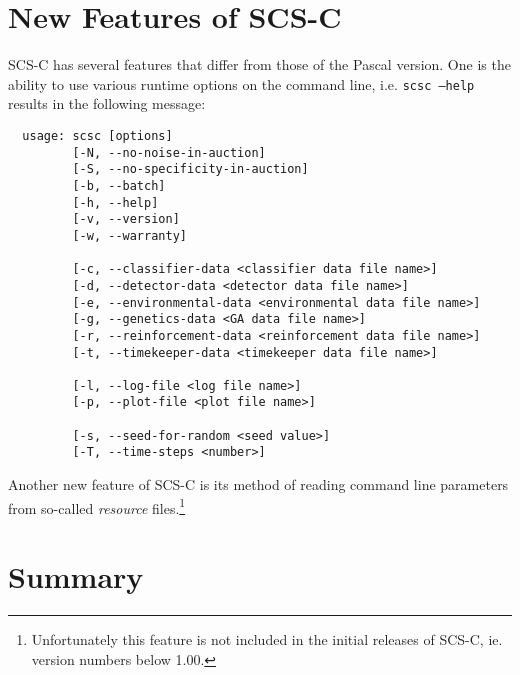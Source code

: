 \section{New Features of SCS-C}
\label{features}

SCS-C has several features that differ from those of the Pascal version.
One is the ability to use various runtime options on the command line, i.e.
{\tt scsc --help} results in the following message:
{\small
\begin{verbatim}
  usage: scsc [options]
         [-N, --no-noise-in-auction]
         [-S, --no-specificity-in-auction]
         [-b, --batch]
         [-h, --help]
         [-v, --version]
         [-w, --warranty]

         [-c, --classifier-data <classifier data file name>]
         [-d, --detector-data <detector data file name>]
         [-e, --environmental-data <environmental data file name>]
         [-g, --genetics-data <GA data file name>]
         [-r, --reinforcement-data <reinforcement data file name>]
         [-t, --timekeeper-data <timekeeper data file name>]

         [-l, --log-file <log file name>]
         [-p, --plot-file <plot file name>]

         [-s, --seed-for-random <seed value>]
         [-T, --time-steps <number>]
\end{verbatim}
}

Another new feature of SCS-C is its method of reading command line parameters
from so-called {\em resource} files.\footnote{Unfortunately this feature
is not included in the initial releases of SCS-C, ie. version numbers below
1.00.}


\section{Summary}
\label{summary}


